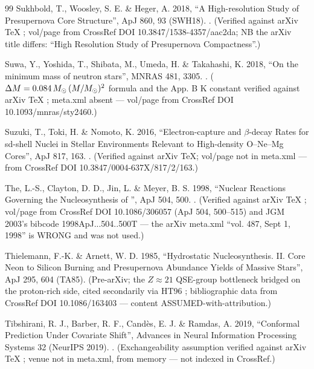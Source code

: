\begin{thebibliography}{99}
Sukhbold, T., Woosley, S. E. \& Heger, A. 2018, ``A High-resolution Study of Presupernova Core Structure'', ApJ 860, 93 (SWH18). . (Verified against arXiv TeX ; vol/page from CrossRef DOI 10.3847/1538-4357/aac2da; NB the arXiv title differs: ``High Resolution Study of Presupernova Compactness''.)

Suwa, Y., Yoshida, T., Shibata, M., Umeda, H. \& Takahashi, K. 2018, ``On the minimum mass of neutron stars'', MNRAS 481, 3305. . ($\Delta M = 0.084\,M_{\odot}\,(M/M_{\odot})^2$ formula and the App. B K constant verified against arXiv TeX ; meta.xml absent --- vol/page from CrossRef DOI 10.1093/mnras/sty2460.)

Suzuki, T., Toki, H. \& Nomoto, K. 2016, ``Electron-capture and $\beta$-decay Rates for sd-shell Nuclei in Stellar Environments Relevant to High-density O--Ne--Mg Cores'', ApJ 817, 163. . (Verified against arXiv TeX; vol/page not in meta.xml --- from CrossRef DOI 10.3847/0004-637X/817/2/163.)

The, L.-S., Clayton, D. D., Jin, L. \& Meyer, B. S. 1998, ``Nuclear Reactions Governing the Nucleosynthesis of '', ApJ 504, 500. . (Verified against arXiv TeX ; vol/page from CrossRef DOI 10.1086/306057 (ApJ 504, 500--515) and JGM 2003's bibcode 1998ApJ...504..500T --- the arXiv meta.xml  ``vol. 487, Sept 1, 1998'' is WRONG and was not used.)

Thielemann, F.-K. \& Arnett, W. D. 1985, ``Hydrostatic Nucleosynthesis. II. Core Neon to Silicon Burning and Presupernova Abundance Yields of Massive Stars'', ApJ 295, 604 (TA85). (Pre-arXiv; the $Z \approx 21$ QSE-group bottleneck bridged on the proton-rich side, cited secondarily via HT96 ; bibliographic data from CrossRef DOI 10.1086/163403 --- content ASSUMED-with-attribution.)

Tibshirani, R. J., Barber, R. F., Cand\`es, E. J. \& Ramdas, A. 2019, ``Conformal Prediction Under Covariate Shift'', Advances in Neural Information Processing Systems 32 (NeurIPS 2019). . (Exchangeability assumption verified against arXiv TeX ; venue not in meta.xml, from memory --- not indexed in CrossRef.)


\end{thebibliography}
